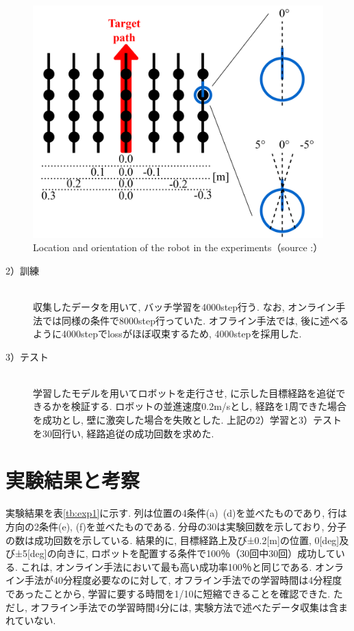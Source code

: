 \begin{figure}[h]
  \centering
  \includegraphics[keepaspectratio, scale=0.6]{images/collect2.png}
  \caption{Location and orientation of the robot in the experiments（source :\cite{offline}）}
  \label{Fig:old-method}
  \end{figure}

\begin{description}
  \item[2）訓練]\mbox{}\\ \hspace*{3mm}収集したデータを用いて, バッチ学習を4000step行う. なお, オンライン手法では同様の条件で8000step行っていた. オフライン手法では, 後に述べるように4000stepでlossがほぼ収束するため, 4000stepを採用した.
\end{description}

\begin{description}
  \item[3）テスト]\mbox{}\\ \hspace*{3mm}学習したモデルを用いてロボットを走行させ, に示した目標経路を追従できるかを検証する. ロボットの並進速度0.2m/sとし, 経路を1周できた場合を成功とし, 壁に激突した場合を失敗とした. 上記の2）学習と3）テストを30回行い, 経路追従の成功回数を求めた. 
\end{description}

\section{実験結果と考察}
実験結果を表\ref{tb:exp1}に示す. 列は位置の4条件(a)~(d)を並べたものであり, 行は方向の2条件(e), (f)を並べたものである. 分母の30は実験回数を示しており, 分子の数は成功回数を示している. 結果的に, 目標経路上及び±0.2[m]の位置, 0[deg]及び±5[deg]の向きに, ロボットを配置する条件で100％（30回中30回）成功している. これは, オンライン手法において最も高い成功率100％\cite{okada-si2021}と同じである. オンライン手法が40分程度必要なのに対して, オフライン手法での学習時間は4分程度であったことから, 学習に要する時間を1/10に短縮できることを確認できた. ただし, オフライン手法での学習時間4分には, 実験方法で述べたデータ収集は含まれていない. 


